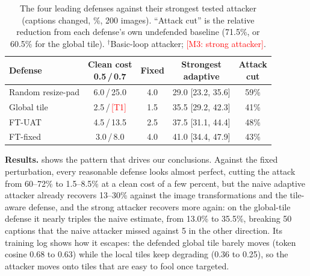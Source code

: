\documentclass[10pt,twocolumn,letterpaper]{article}
\newcommand{\pend}[1]{\textcolor{red}{[#1]}}
\begin{document}
\begin{table}[t]
\centering
\small
\setlength{\tabcolsep}{2.6pt}
\begin{tabular}{@{}lcccc@{}}
\toprule
Defense & \makecell{Clean cost\\0.5\,/\,0.7} & Fixed & \makecell{Strongest\\adaptive} & \makecell{Attack\\cut} \\
\midrule
Random resize-pad & 6.0\,/\,25.0 & 4.0 & 29.0 {\scriptsize[23.2, 35.6]} & 59\% \\
Global tile & 2.5\,/\,\pend{T1} & 1.5 & 35.5 {\scriptsize[29.2, 42.3]} & 41\% \\
FT-UAT & 4.5\,/\,13.5 & 2.5 & 37.5 {\scriptsize[31.1, 44.4]}\rlap{$^\dagger$} & 48\% \\
FT-fixed & 3.0\,/\,8.0 & 4.0 & 41.0 {\scriptsize[34.4, 47.9]}\rlap{$^\dagger$} & 43\% \\
\bottomrule
\end{tabular}
\caption{The four leading defenses against their strongest tested attacker (captions changed, \%, 200 images). ``Attack cut'' is the relative reduction from each defense's own undefended baseline (71.5\%, or 60.5\% for the global tile). $^\dagger$Basic-loop attacker; \pend{M3: strong attacker}.}
\label{tab:defense}
\end{table}

\textbf{Results.}  shows the pattern that drives our conclusions. Against the fixed perturbation, every reasonable defense looks almost perfect, cutting the attack from 60--72\% to 1.5--8.5\% at a clean cost of a few percent, but the naive adaptive attacker already recovers 13--30\% against the image transformations and the tile-aware defense, and the strong attacker recovers more again: on the global-tile defense it nearly triples the naive estimate, from 13.0\% to 35.5\%, breaking 50 captions that the naive attacker missed against 5 in the other direction. Its training log shows how it escapes: the defended global tile barely moves (token cosine 0.68 to 0.63) while the local tiles keep degrading (0.36 to 0.25), so the attacker moves onto tiles that are easy to fool once targeted.
\end{document}

